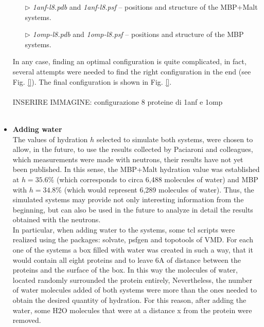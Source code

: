 \begin{itemize}
\begin{itemize}
\item[$\triangleright$] \textit{1anf-l8.pdb} and \textit{1anf-l8.psf} -- positions and structure of the MBP+Malt systems.
\item[$\triangleright$] \textit{1omp-l8.pdb} and \textit{1omp-l8.psf} -- positions and structure of the MBP systems.
\end{itemize}
In any case, finding an optimal configuration is quite complicated, in fact, several attempts were needed to find the right configuration in the end (see Fig. \ref{}). The final configuration is shown in Fig. \ref{}. \\
\\
INSERIRE IMMAGINE: configurazione 8 proteine di 1anf e 1omp\\
\\
\item \textbf{Adding water}\\
The values of hydration $h$ selected to simulate both systems, were chosen to allow, in the future, to use the results collected by Paciaroni and colleagues, which measurements were made with neutrons, their results have not yet been published. In this sense, the MBP+Malt hydration value was established at $h = 35.6\%$  (which corresponds to circa 6,488 molecules of water) and MBP with $h = 34.8\%$ (which would represent 6,289 molecules of water).
Thus, the simulated systems may provide not only interesting information from the beginning, but can also be used in the future to analyze in detail the results obtained with the neutrons.\\
In particular, when adding water to the systems, some tcl scripts were realized using the packages: solvate, psfgen and topotools of VMD. For each one of the systems a box filled with water was created in such a way, that it would contain all eight proteins and to leave 6A   of distance between the proteins and the surface of the box. In this way the molecules of water, located randomly surrounded the protein entirely, Nevertheless, the number of water molecules added of both systems were more than the ones needed to obtain the desired quantity of hydration. For this reason, after adding the water, some H2O molecules that were at a distance x from the protein were removed.


\end{itemize}
